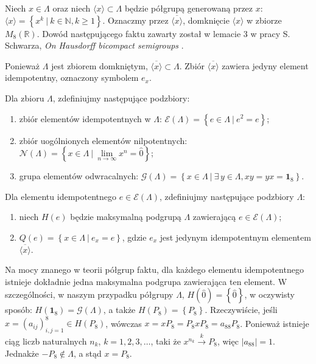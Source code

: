 {Niech $x \in \Lambda$ oraz niech
$\langle x \rangle \subset \Lambda$ będzie półgrupą generowaną przez $x$:
$\langle x \rangle = \left \{ x^{k} \: | \: k \in \mathbb{N}, k \geq 1 \right \}$.
Oznaczmy przez $\overline{\langle x \rangle}$,
domknięcie $\langle x \rangle$ w zbiorze $M_{8}(\mathbb{R})$.
Dowód następującego faktu zawarty został w lemacie 3 w
pracy S.\,Schwarza, \emph{On Hausdorff bicompact semigroups}
\cite{schwarz1955hausdorff}.

\begin{Theorem}
    \label{prop:UniqeClusterPoint}
    Ponieważ $\Lambda$ jest zbiorem domkniętym, $\overline{\langle x \rangle} \subset \Lambda$.
    Zbiór $\overline{\langle x \rangle}$ zawiera jedyny element idempotentny,
    oznaczony symbolem $e_{x}$.
\end{Theorem}

\begin{Definition}
    Dla zbioru $\Lambda$, zdefiniujmy następujące podzbiory:
    \begin{enumerate}
       \item zbiór elementów idempotentnych w $\Lambda$:
            $\mathcal{E}(\Lambda) = \left \{ e \in \Lambda \: |  \: e^{2} = e \right \}$;
       \item zbiór uogólnionych elementów nilpotentnych:\\
            $\mathcal{N}(\Lambda) = \left \{ x \in \Lambda \: |  \: \lim \limits_{n \rightarrow \infty} x^{n} = \hat{0} \right \}$;
       \item grupa elementów odwracalnych:
            $\mathcal{G}(\Lambda) = \left \{ x \in \Lambda \: |  \: \exists \, y \in \Lambda, xy = yx = \mathbf{1}_{8} \right \}$.
    \end{enumerate}
   Dla elementu idempotentnego $e \in \mathcal{E}(\Lambda)$,
   zdefiniujmy następujące podzbiory $\Lambda$:
   \begin{enumerate}
        \item niech $H(e)$ będzie maksymalną podgrupą $\Lambda$
            zawierającą $e \in \mathcal{E}(\Lambda)$;
        \item $Q(e) = \left \{ x \in \Lambda \: | \: e_{x} = e \right \}$,
        gdzie $e_{x}$ jest jedynym idempotentnym elementem
        $\overline{\langle x \rangle}$.
   \end{enumerate}
\end{Definition}

\begin{Remark}
\label{rem:GOfLambda}
Na mocy znanego w teorii półgrup faktu, dla każdego elementu idempotentnego
istnieje dokładnie jedna maksymalna podgrupa zawierająca ten element.
W szczególności, w naszym przypadku półgrupy $\Lambda$,
$H(\hat{0}) = \left \{ \hat{0} \right \}$,
w oczywisty sposób:
$H(\mathbf{1}_{8}) = \mathcal{G}(\Lambda)$,
a także $H(P_{8}) = \left \{ P_{8} \right \}$.
Rzeczywiście,
jeśli $x = (a_{ij})_{i,j=1}^{8} \in H(P_{8})$,
wówczas
$x = x P_{8} = P_{8} x P_{8} = a_{88} P_{8}$.
Ponieważ istnieje ciąg liczb naturalnych  $n_{k}$, $k=1,2,3,\ldots$,
taki że $x^{n_{k}} \overset{k}{\rightarrow} P_{8}$,
więc
$|a_{88}| = 1$. Jednakże $- P_{8} \notin \Lambda$,
a stąd $x = P_{8}$.
\end{Remark}

}
